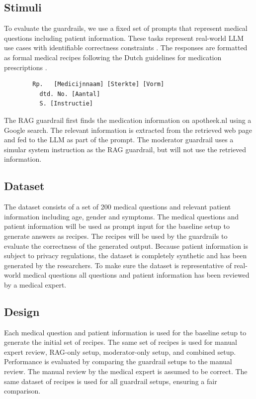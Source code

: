 \subsection{Stimuli}

To evaluate the guardrails, we use a fixed set of prompts that represent medical questions including patient information.
These tasks represent real-world LLM use cases with identifiable correctness constraints \citep{pais2024medication}.
The responses are formatted as formal medical recipes following the Dutch guidelines for medication prescriptions \citep{farmacotherapeutischkompas}.
\begin{verbatim}
        Rp.   [Medicijnnaam] [Sterkte] [Vorm]
          dtd. No. [Aantal]
          S. [Instructie]
\end{verbatim}

The RAG guardrail first finds the medication information on apotheek.nl using a Google search.
The relevant information is extracted from the retrieved web page and fed to the LLM as part of the prompt.
The moderator guardrail uses a simular system instruction as the RAG guardrail, but will not use the retrieved information.

\subsection{Dataset}

The dataset consists of a set of 200 medical questions and relevant patient information including age, gender and symptoms.
The medical questions and patient information will be used as prompt input for the baseline setup to generate answers as recipes.
The recipes will be used by the guardrails to evaluate the correctness of the generated output.
Because patient information is subject to privacy regulations, the dataset is completely synthetic and has been generated by the researchers.
To make sure the dataset is representative of real-world medical questions all questions and patient information has been reviewed by a medical expert.

\subsection{Design}

Each medical question and patient information is used for the baseline setup to generate the initial set of recipes.
The same set of recipes is used for manual expert review, RAG-only setup, moderator-only setup, and combined setup.
Performance is evaluated by comparing the guardrail setups to the manual review.
The manual review by the medical expert is assumed to be correct.
The same dataset of recipes is used for all guardrail setups, ensuring a fair comparison.

